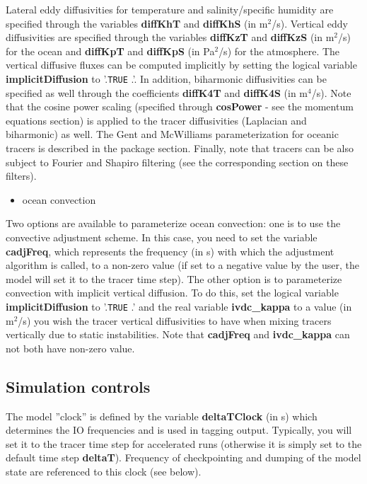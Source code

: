 Lateral eddy diffusivities for temperature and salinity/specific humidity
are specified through the variables \textbf{diffKhT }and \textbf{diffKhS }%
(in m$^{2}$/s). Vertical eddy diffusivities are specified through the
variables \textbf{diffKzT }and \textbf{diffKzS }(in m$^{2}$/s) for the ocean
and \textbf{diffKpT }and \textbf{diffKpS }(in Pa$^{2}$/s) for the
atmosphere. The vertical diffusive fluxes can be computed implicitly by
setting the logical variable \textbf{implicitDiffusion }to '.\texttt{TRUE}%
.'. In addition, biharmonic diffusivities can be specified as well through
the coefficients \textbf{diffK4T }and \textbf{diffK4S }(in m$^{4}$/s). Note
that the cosine power scaling (specified through \textbf{cosPower }- see the
momentum equations section) is applied to the tracer diffusivities
(Laplacian and biharmonic) as well. The Gent and McWilliams parameterization
for oceanic tracers is described in the package section. Finally, note that
tracers can be also subject to Fourier and Shapiro filtering (see the
corresponding section on these filters).

\begin{itemize}
\item ocean convection
\end{itemize}

Two options are available to parameterize ocean convection: one is to use
the convective adjustment scheme. In this case, you need to set the variable 
\textbf{cadjFreq}, which represents the frequency (in s) with which the
adjustment algorithm is called, to a non-zero value (if set to a negative
value by the user, the model will set it to the tracer time step). The other
option is to parameterize convection with implicit vertical diffusion. To do
this, set the logical variable \textbf{implicitDiffusion }to '.\texttt{TRUE}%
.' and the real variable \textbf{ivdc\_kappa }to a value (in m$^{2}$/s) you
wish the tracer vertical diffusivities to have when mixing tracers
vertically due to static instabilities. Note that \textbf{cadjFreq }and 
\textbf{ivdc\_kappa }can not both have non-zero value.

\subsection{Simulation controls}

The model ''clock'' is defined by the variable \textbf{deltaTClock }(in s)
which determines the IO frequencies and is used in tagging output.
Typically, you will set it to the tracer time step for accelerated runs
(otherwise it is simply set to the default time step \textbf{deltaT}).
Frequency of checkpointing and dumping of the model state are referenced to
this clock (see below).

